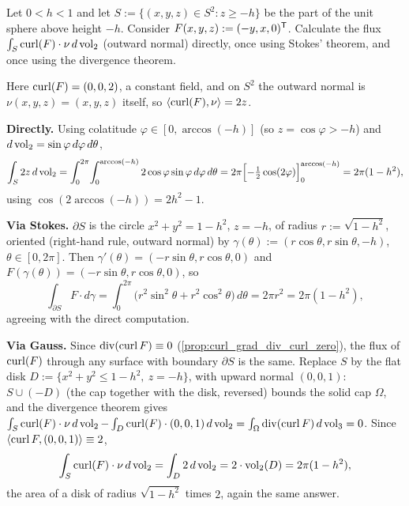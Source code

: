 \begin{exercise}
\label{ex:spherical_cap_flux_stokes_gauss}
Let $0<h<1$ and let $S := \{(x,y,z)\in S^2 : z\geq -h\}$ be the part of the unit sphere above
height $-h$. Consider $F(x,y,z) := (-y,x,0)^{\mathsf{T}}$. Calculate the flux
$\int_S\operatorname{curl}(F)\cdot\nu\,d\operatorname{vol}_2$ (outward normal) directly, once using Stokes' theorem, and
once using the divergence theorem.
\end{exercise}

\begin{exercisesolution}
Here $\operatorname{curl}(F) = (0,0,2)$, a constant field, and on $S^2$ the outward normal is
$\nu(x,y,z)=(x,y,z)$ itself, so $\langle\operatorname{curl}(F),\nu\rangle = 2z$.

\textbf{Directly.} Using colatitude $\varphi\in[0,\arccos(-h)]$ (so $z=\cos\varphi>-h$) and
$d\operatorname{vol}_2=\sin\varphi\,d\varphi\,d\theta$,
\[\int_S 2z\,d\operatorname{vol}_2 = \int_0^{2\pi}\!\int_0^{\arccos(-h)} 2\cos\varphi\sin\varphi\,d\varphi\,d\theta
  = 2\pi\Big[{-}\tfrac12\cos(2\varphi)\Big]_0^{\arccos(-h)} = 2\pi(1-h^2),\]
using $\cos(2\arccos(-h)) = 2h^2-1$.

\textbf{Via Stokes.} $\partial S$ is the circle $x^2+y^2=1-h^2$, $z=-h$, of radius
$r:=\sqrt{1-h^2}$, oriented (right-hand rule, outward normal) by
$\gamma(\theta) := (r\cos\theta,r\sin\theta,-h)$, $\theta\in[0,2\pi]$. Then
$\gamma'(\theta) = (-r\sin\theta,r\cos\theta,0)$ and $F(\gamma(\theta)) =
(-r\sin\theta,r\cos\theta,0)$, so
\[\int_{\partial S}F\cdot d\gamma = \int_0^{2\pi}\big(r^2\sin^2\theta+r^2\cos^2\theta\big)\,d\theta
  = 2\pi r^2 = 2\pi(1-h^2),\]
agreeing with the direct computation.

\textbf{Via Gauss.} Since $\operatorname{div}(\operatorname{curl} F)\equiv0$ (\cref{prop:curl_grad_div_curl_zero}), the flux
of $\operatorname{curl}(F)$ through any surface with boundary $\partial S$ is the same. Replace $S$ by the
flat disk $D := \{x^2+y^2\leq1-h^2,\ z=-h\}$, with upward normal $(0,0,1)$: $S\cup(-D)$
(the cap together with the disk, reversed) bounds the solid cap $\Omega$, and the divergence
theorem gives $\int_S\operatorname{curl}(F)\cdot\nu\,d\operatorname{vol}_2 - \int_D\operatorname{curl}(F)\cdot(0,0,1)\,d\operatorname{vol}_2 =
\int_\Omega\operatorname{div}(\operatorname{curl} F)\,d\operatorname{vol}_3 = 0$. Since $\langle\operatorname{curl} F,(0,0,1)\rangle\equiv2$,
\[\int_S\operatorname{curl}(F)\cdot\nu\,d\operatorname{vol}_2 = \int_D 2\,d\operatorname{vol}_2 = 2\cdot\operatorname{vol}_2(D) = 2\pi(1-h^2),\]
the area of a disk of radius $\sqrt{1-h^2}$ times $2$, again the same answer.
\end{exercisesolution}

